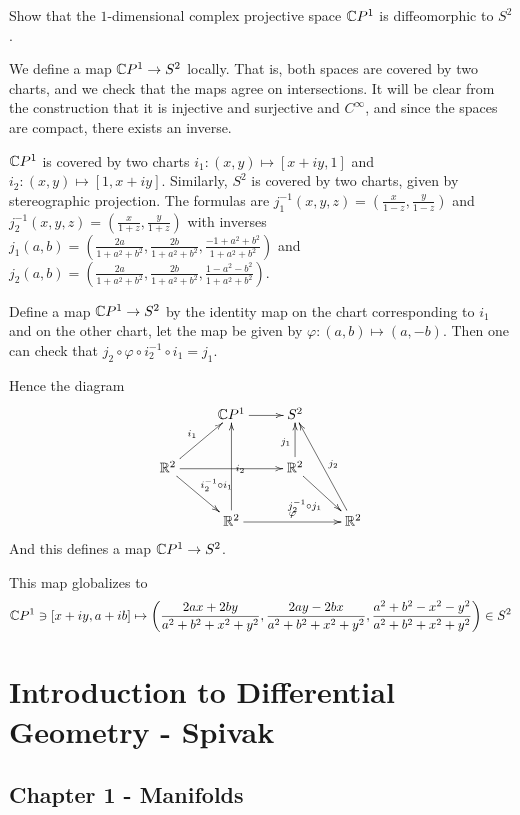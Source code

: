 \documentclass[11pt, english]{article}
\begin{document}
\begin{exc}[1.3]

Show that the $1$-dimensional complex projective space $\mathbb{C} P^1$ is diffeomorphic to $S^2$.
\end{exc}

\begin{sol}
We define a map $\mathbb{C} P^1 \to S^2$ locally. That is, both spaces are covered by two charts, and we check that the maps agree on intersections. It will be clear from the construction that it is injective and surjective and $C^\infty$, and since the spaces are compact, there exists an inverse.

$\mathbb{C} P ^1$ is covered by two charts $i_1:(x,y) \mapsto [x+iy,1]$ and $i_2:(x,y) \mapsto [1,x+iy]$. Similarly, $S^2$ is covered by two charts, given by stereographic projection. The formulas are $j_1^{-1} (x,y,z) = \left (\frac{x}{1-z}, \frac{y}{1-z}\right)$ and $j_2^{-1}(x,y,z) = \left( \frac{x}{1+z},\frac{y}{1+z} \right)$ with inverses $j_1(a,b) = \left( \frac{2a}{1+a^2+b^2}, \frac{2b}{1+a^2+b^2}, \frac{-1+a^2+b^2}{1+a^2+b^2}\right)$ and $j_2(a,b) = \left( \frac{2a}{1+a^2+b^2}, \frac{2b}{1+a^2+b^2}, \frac{1-a^2-b^2}{1+a^2+b^2} \right)$.

Define a map $\mathbb{C} P^1 \to S^2$ by the identity map on the chart corresponding to $i_1$ and on the other chart, let the map be given by $\varphi: (a,b) \mapsto (a,-b)$. Then one can check that $ j_2 \circ \varphi \circ i_2^{-1} \circ i_1 = j_1$.

Hence the diagram
\[
\xymatrix{
 & \C P^1 \ar[r] & S^2 & \\
\R^2 \ar[ur]^{i_1} \ar[dr]^{i_2^{-1} \circ i_1} \ar[rr] & & \R^2 \ar[dr]_{j_2^{-1} \circ j_ 1} \ar[u]^{j_1} & \\
& \R^2 \ar[uu]_{i_2} \ar[rr]^\varphi & & \R^2 \ar[uul]_{j_2} 
}
\]
And this defines a map $\mathbb{C} P^1 \to S^2$. 

This map globalizes to
\[
\mathbb{C} P ^1 \ni [x+iy, a+ib] \mapsto \left( \frac{2ax+2by}{a^2+b^2+x^2+y^2}, \frac{2ay-2bx}{a^2+b^2+x^2+y^2}, \frac{a^2+b^2-x^2-y^2}{a^2+b^2+x^2+y^2}\right) \in S^2
\]
\end{sol}




\section{Introduction to Differential Geometry - Spivak}

\subsection{Chapter 1 - Manifolds}
\end{document}
